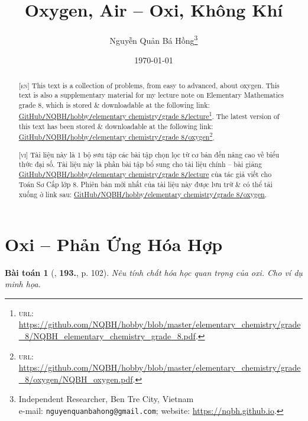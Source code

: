 \documentclass{article}
\title{Oxygen, Air -- Oxi, Không Khí}
\author{Nguyễn Quản Bá Hồng\footnote{Independent Researcher, Ben Tre City, Vietnam\\e-mail: \texttt{nguyenquanbahong@gmail.com}; website: \url{https://nqbh.github.io}.}}
\date{\today}
\numberwithin{equation}{section}
\newtheorem{baitoan}{Bài toán}
\begin{document}
\maketitle
\begin{abstract}
	\textsc{[en]} This text is a collection of problems, from easy to advanced, about oxygen. This text is also a supplementary material for my lecture note on Elementary Mathematics grade 8, which is stored \& downloadable at the following link: \href{https://github.com/NQBH/hobby/blob/master/elementary_chemistry/grade_8/NQBH_elementary_chemistry_grade_8.pdf}{GitHub\texttt{/}NQBH\texttt{/}hobby\texttt{/}elementary chemistry\texttt{/}grade 8\texttt{/}lecture}\footnote{\textsc{url}: \url{https://github.com/NQBH/hobby/blob/master/elementary_chemistry/grade_8/NQBH_elementary_chemistry_grade_8.pdf}.}. The latest version of this text has been stored \& downloadable at the following link: \href{https://github.com/NQBH/hobby/blob/master/elementary_chemistry/grade_8/oxygen/NQBH_oxygen.pdf}{GitHub\texttt{/}NQBH\texttt{/}hobby\texttt{/}elementary chemistry\texttt{/}grade 8\texttt{/}oxygen}\footnote{\textsc{url}: \url{https://github.com/NQBH/hobby/blob/master/elementary_chemistry/grade_8/oxygen/NQBH_oxygen.pdf}.}.
	\vspace{2mm}
	
	\textsc{[vi]} Tài liệu này là 1 bộ sưu tập các bài tập chọn lọc từ cơ bản đến nâng cao về biểu thức đại số. Tài liệu này là phần bài tập bổ sung cho tài liệu chính -- bài giảng \href{https://github.com/NQBH/hobby/blob/master/elementary_chemistry/grade_8/NQBH_elementary_chemistry_grade_8.pdf}{GitHub\texttt{/}NQBH\texttt{/}hobby\texttt{/}elementary chemistry\texttt{/}grade 8\texttt{/}lecture} của tác giả viết cho Toán Sơ Cấp lớp 8. Phiên bản mới nhất của tài liệu này được lưu trữ \& có thể tải xuống ở link sau: \href{https://github.com/NQBH/hobby/blob/master/elementary_chemistry/grade_8/oxygen/NQBH_oxygen.pdf}{GitHub\texttt{/}NQBH\texttt{/}hobby\texttt{/}elementary chemistry\texttt{/}grade 8\texttt{/}oxygen}.
\end{abstract}
\tableofcontents
\newpage


\section{Oxi -- Phản Ứng Hóa Hợp}

\begin{baitoan}[\cite{An_400_BT_Hoa_Hoc_8_2020}, \textbf{193.}, p. 102]
	Nêu tính chất hóa học quan trọng của oxi. Cho ví dụ minh họa.
\end{baitoan}
\end{document}
